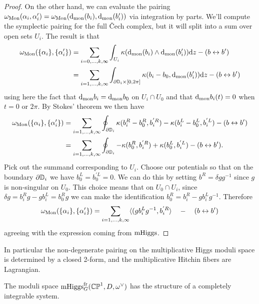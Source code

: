 \documentclass[10pt, oneside]{article}
\DeclareMathOperator{\mhiggs}{mHiggs}
\renewcommand{\d}{\mathrm{d}}
\newcommand{\fr}{\mathrm{fr}}
\begin{document}
\begin{proof}
On the other hand, we can evaluate the pairing $\omega_{\mr{Mon}}(\alpha_i,\alpha'_i) = \omega_{\mr{Mon}}(\d_{\mr{mon}}(b_i),\d_{\mr{mon}}(b_i'))$ via integration by parts. We'll compute the symplectic pairing for the full \v Cech complex, but it will split into a sum over open sets $U_i$.  The result is that 
\begin{align*}
\omega_{\mr{Mon}}(\{\alpha_i\},\{\alpha'_i\}) &= \sum_{i=0,\ldots,k,\infty} \int_{U_i} \kappa(\d_{\mr{mon}}(b_i) \wedge \d_{\mr{mon}}(b_i')) \d z - (b \leftrightarrow b')\\
&= \sum_{i=1,\ldots,k,\infty} \int_{\dd \bb D_i \times [0,2\pi]} \kappa(b_i - b_0, \d_{\mr{mon}}(b'_i)) \d z - (b \leftrightarrow b')
\end{align*}
using here the fact that $\d_{\mr{mon}}b_i = \d_{\mr{mon}} b_0$ on $U_i \cap U_0$ and that $\d_{\mr{mon}} b_i(t) = 0$ when $t = 0$ or $2\pi$.  By Stokes' theorem we then have
\begin{align*}
 \omega_{\mathrm{Mon}}(\{\alpha_i\},\{\alpha'_i\})&= \sum_{i=1,\ldots,k,\infty} \oint_{\partial \mathbb{D}_i} \kappa(b_i^R - b_0^R, b_i^{'R}) - \kappa(b_i^L - b_0^L, b_i^{'L}) - (b \leftrightarrow b') \\
 &= \sum_{i=1,\ldots,k,\infty} \oint_{\partial \mathbb{D}_i} - \kappa(b_0^R, b_i^{'R}) + \kappa(b_0^L, b_i^{'L}) - (b \leftrightarrow b').
\end{align*}
Pick out the summand corresponding to $U_i$.  Choose our potentials so that on the boundary $\partial \mathbb{D}_i$ we have $b_0^L = b_0^{'L} = 0$.  We can do this by setting $b^{R} = \delta g g^{-1}$ since $g$ is non-singular on $U_0$.  This choice means that on $U_0 \cap U_i$, since $\delta g  = b_{i} ^R g - g b_i^L = b_0^{R} g $ we can make the identification $ b_0^{R} = b_{i}^{R} - g b_{i}^{L} g^{-1}$.  Therefore
\[\omega_{\mathrm{Mon}}(\{\alpha_i\},\{\alpha'_i\}) = \sum_{i=1,\ldots,k,\infty} \langle(g b_i^{L} g^{-1}, b_i^{'R}\rangle \quad - \quad  (b \leftrightarrow b')\]
agreeing with the expression coming from $\mathrm{mHiggs}$. 
\end{proof}

In particular the non-degenerate pairing on the multiplicative Higgs moduli space is determined by a closed 2-form, and the multiplicative Hitchin fibers are Lagrangian.

\begin{corollary}
The moduli space $\mhiggs^\fr_G(\bb{CP}^1,D,\omega^\vee)$ has the structure of a completely integrable system.
\end{corollary}
\end{document}
